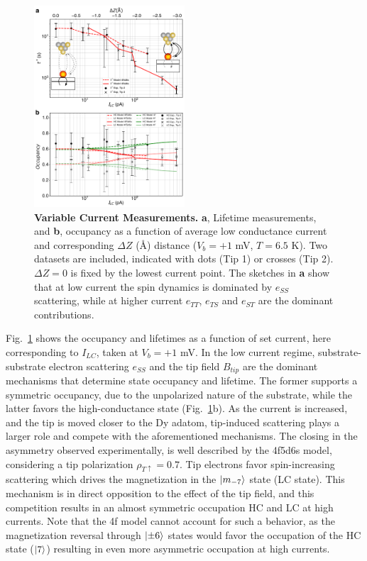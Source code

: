 \documentclass[
reprint,amsmath,amssymb,aps]{revtex4-2}
\begin{document}
\begin{figure}[h!]
\includegraphics[width=0.5\textwidth]{fig5_final_v3.pdf}
\caption{\textbf{Variable Current Measurements.} \textbf{a}, Lifetime measurements, and \textbf{b}, occupancy as a function of average low conductance current and corresponding $\Delta Z$ (\AA) distance ($V_{b} = +1$ mV, $T = 6.5$ K). Two datasets are included, indicated with dots (Tip 1) or crosses (Tip 2). $\Delta Z = 0$ is fixed by the lowest current point. The sketches in \textbf{a} show that  at low current the spin dynamics is dominated by $e_{SS}$ scattering, while at higher current $e_{TT}$, $e_{TS}$ and $e_{ST}$ are the dominant contributions. 
\label{fig:current} }
\end{figure}

Fig.~\ref{fig:current} shows the occupancy and lifetimes as a function of set current, here corresponding to $I_{LC}$, taken at $V_{b} = +1$ mV. In the low current regime, substrate-substrate electron scattering $e_{SS}$ and the tip field $B_{tip}$ are the dominant mechanisms that determine state occupancy and lifetime. The former supports a symmetric occupancy, due to the unpolarized nature of the substrate, while the latter favors the high-conductance state (Fig.~\ref{fig:current}b). As the current is increased, and the tip is moved closer to the Dy adatom, tip-induced scattering plays a larger role and compete with the aforementioned mechanisms. The closing in the asymmetry observed experimentally, is well described by the 4f5d6s model, considering a tip polarization $\rho_{T \uparrow} = 0.7$. Tip electrons favor spin-increasing scattering which drives the magnetization in the $\ket{m_{-7}}$ state (LC state). This mechanism is in direct opposition to the effect of the tip field, and this competition results in an almost symmetric occupation HC and LC at high currents. Note that the 4f model cannot account for such a behavior, as the magnetization reversal through $\ket{\pm 6}$ states would favor the occupation of the HC state ($\ket{7}$) resulting in even more asymmetric occupation at high currents.
\end{document}
